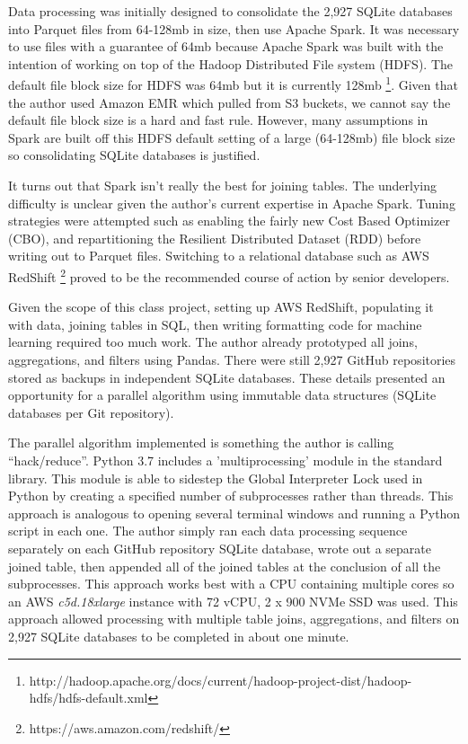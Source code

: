 \documentclass{article}
\begin{document}
Data processing was initially designed to consolidate the 2,927 SQLite
databases into Parquet files from 64-128mb in size, then use Apache Spark.
It was necessary to use files with a guarantee of 64mb because Apache Spark
was built with the intention of working on top of the Hadoop Distributed
File system (HDFS). The default file block size for HDFS was 64mb but it
is currently 128mb \footnote{http://hadoop.apache.org/docs/current/hadoop-project-dist/hadoop-hdfs/hdfs-default.xml}. Given that the author used
Amazon EMR which pulled from S3 buckets, we cannot say the default file
block size is a hard and fast rule. However, many assumptions in Spark are
built off this HDFS default setting of a large (64-128mb) file block size so
consolidating SQLite databases is justified.

It turns out that Spark isn't really the best for joining tables. The
underlying difficulty is unclear given the author's current expertise in
Apache Spark. Tuning strategies were attempted such as enabling the fairly
new Cost Based Optimizer (CBO), and repartitioning the Resilient Distributed
Dataset (RDD) before writing out to Parquet files. Switching to a
relational database such as AWS RedShift \footnote{https://aws.amazon.com/redshift/} proved to be the recommended course of action by senior developers.

Given the scope of this class project, setting up AWS RedShift, populating
it with data, joining tables in SQL, then writing formatting code for
machine learning required too much work. The author already prototyped all
joins, aggregations, and filters using Pandas. There were still  2,927 GitHub
repositories stored as backups in independent SQLite databases. These details
presented an opportunity for a parallel algorithm using immutable data
structures (SQLite databases per Git repository). 

The parallel algorithm implemented is something the author is calling
``hack/reduce''. Python 3.7 includes a 'multiprocessing' module in the
standard library. This module is able to sidestep the Global Interpreter
Lock used in Python by creating a specified number of subprocesses rather
than threads. This approach is analogous to opening several terminal windows
and running a Python script in each one. The author simply ran each data
processing sequence separately on each GitHub repository SQLite database,
wrote out a separate joined table, then appended all of the joined tables
at the conclusion of all the subprocesses. This approach works best with
a CPU containing multiple cores so an AWS \textit{c5d.18xlarge} instance
with 72 vCPU, 2 x 900 NVMe SSD was used. This approach allowed processing
with multiple table joins, aggregations, and filters on 2,927 SQLite
databases to be completed in about one minute.
\end{document}
